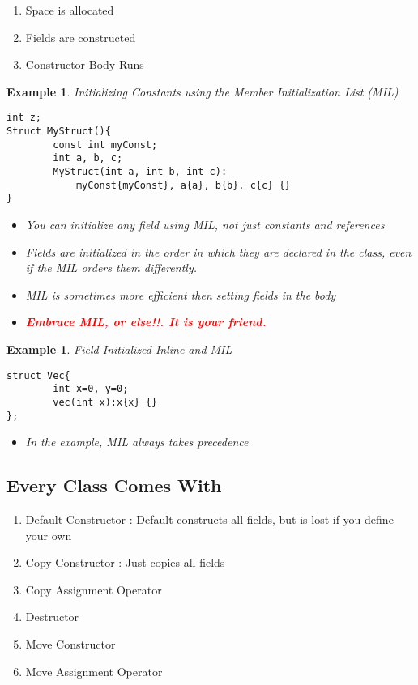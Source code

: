 \documentclass{article}
\newtheorem{ex}[theorem]{Example}
\newenvironment{exblock}[1]{%
    \tcolorbox[beamer,%
    noparskip,breakable,
    colback=lightgreen,colframe=darkgreen,%
    colbacklower=limegreen!75!lightgreen,%
    title=#1]}%
    {\endtcolorbox}
\begin{document}
\begin{exblock}{What happens when a object is created?}
\begin{enumerate}
\item Space is allocated 
\item Fields are constructed 
\item Constructor Body Runs 
\end{enumerate}
\end{exblock}
\newpage
\begin{ex} Initializing Constants using the Member Initialization List (MIL)
\begin{lstlisting}
int z;
Struct MyStruct(){
		const int myConst;
		int a, b, c;
		MyStruct(int a, int b, int c):
			myConst{myConst}, a{a}, b{b}. c{c} {}
}
\end{lstlisting}
\begin{itemize}
\item You can initialize any field using MIL, not just constants and references
\item Fields are initialized in the order in which they are declared in the class, even if the MIL orders them differently. 
\item MIL is sometimes more efficient then setting fields in the body 
\item \textbf{\textcolor{red}{Embrace MIL, or else!!. It is your friend.}}
\end{itemize}
\end{ex}

\begin{ex} Field Initialized Inline and MIL
\begin{lstlisting}
struct Vec{
		int x=0, y=0;
		vec(int x):x{x} {}
};
\end{lstlisting}
\begin{itemize}
\item In the example, MIL always takes precedence 
\end{itemize}
\end{ex}

\subsection{Every Class Comes With}
\begin{enumerate}
\item Default Constructor : Default constructs all fields, but is lost if you define your own
\item Copy Constructor : Just copies all fields
\item Copy Assignment Operator 
\item Destructor 
\item Move Constructor 
\item Move Assignment Operator 
\end{enumerate}
\end{document}
